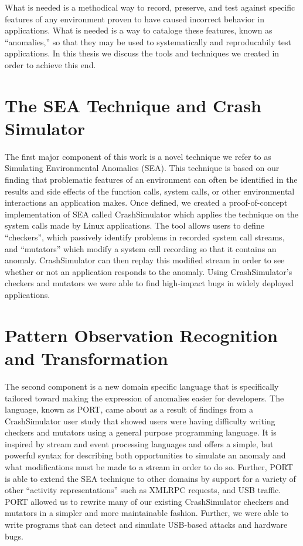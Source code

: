 What is needed is a methodical way to record, preserve, and test against
specific features of any environment proven to have caused incorrect
behavior in applications.
What is needed is a way to cataloge these features,
known as ``anomalies,''
so that they may be used to systematically and reproducabily test applications.
In this thesis we discuss the tools and techniques we created in order to achieve this end.

\section{The SEA Technique and Crash Simulator}
The first major component of this work is a novel technique we refer to as Simulating Environmental Anomalies (SEA).
This technique is based on our finding that problematic features of an environment can often be identified in the results and side effects of the function calls, system calls, or other environmental interactions an application makes.
Once defined,
we created a proof-of-concept implementation of SEA called CrashSimulator which applies the technique on the system calls made by Linux applications.
The tool allows users to define ``checkers'',
which passively identify problems in recorded system call streams,
and ``mutators'' which modify a system call recording so that it contains an anomaly.
CrashSimulator can then replay this modified stream in order to see whether or not
an application responds to the anomaly.
Using CrashSimulator's checkers and mutators we were able to find high-impact bugs in widely deployed applications.

\section{Pattern Observation Recognition and Transformation}
The second component is a new domain specific language that is specifically tailored toward making the expression of anomalies easier for developers.
The language,
known as PORT,
came about as a result of findings from a CrashSimulator user study that showed users were having difficulty writing checkers and mutators using a general purpose programming language.
It is inspired by stream and event processing languages and offers a simple,
but powerful syntax for describing both opportunities to simulate an anomaly and what modifications must be made to a stream in order to do so.
Further, PORT is able to extend the SEA technique to other domains by support for a variety of other ``activity representations'' such as XMLRPC requests, and USB traffic.
PORT allowed us to rewrite many of our existing CrashSimulator checkers and mutators in a simpler and more maintainable fashion.
Further, we were able to write programs that can detect and simulate USB-based attacks and hardware bugs.

